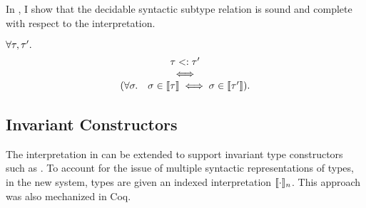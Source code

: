 In \cite{bib:belyakova:minijl-sub:ftfjp:2019}, I show that the decidable 
syntactic subtype relation is sound and complete with respect
to the interpretation.

\begin{theorem}[]
    $\forall \tau, \tau'.$
    \[
        \begin{array}{c}
            \tau <: \tau' \\
            \iff \\
            (\forall \sigma.\quad \sigma \in \llbracket \tau \rrbracket \iff
                \sigma \in \llbracket \tau' \rrbracket).
        \end{array}
    \]
\end{theorem}

\subsection{Invariant Constructors}

The interpretation in  can be extended to support
invariant type constructors such as .
To account for the issue of multiple syntactic representations of types,
in the new system, types are given an indexed interpretation $\llbracket \cdot \rrbracket_n$.
This approach was also mechanized in Coq.

